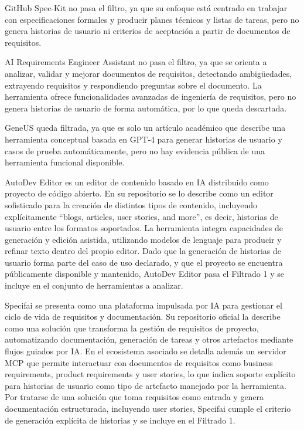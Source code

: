 GitHub Spec-Kit \cite{spec-kit} no pasa el filtro, ya que su enfoque está centrado en trabajar con especificaciones formales y producir planes técnicos y listas de tareas, pero no genera historias de usuario ni criterios de aceptación a partir de documentos de requisitos.

AI Requirements Engineer Assistant \cite{ai-requirements-engineer-assistant} no pasa el filtro, ya que se orienta a analizar, validar y mejorar documentos de requisitos, detectando ambigüedades, extrayendo requisitos y respondiendo preguntas sobre el documento. La herramienta ofrece funcionalidades avanzadas de ingeniería de requisitos, pero no genera historias de usuario de forma automática, por lo que queda descartada.

GeneUS \cite{geneuS}  queda filtrada, ya que es solo un artículo académico que describe una herramienta conceptual basada en GPT‑4 para generar historias de usuario y casos de prueba automáticamente, pero no hay evidencia pública de una herramienta funcional disponible.


AutoDev Editor \cite{autodeveditor} es un editor de contenido basado en IA distribuido como proyecto de código abierto. En su repositorio se lo describe como un editor sofisticado para la creación de distintos tipos de contenido, incluyendo explícitamente “blogs, articles, user stories, and more”, es decir, historias de usuario entre los formatos soportados. La herramienta integra capacidades de generación y edición asistida, utilizando modelos de lenguaje para producir y refinar texto dentro del propio editor. Dado que la generación de historias de usuario forma parte del caso de uso declarado, y que el proyecto se encuentra públicamente disponible y mantenido, AutoDev Editor pasa el Filtrado 1 y se incluye en el conjunto de herramientas a analizar.

Specifai \cite{specifai} se presenta como una plataforma impulsada por IA para gestionar el ciclo de vida de requisitos y documentación. Su repositorio oficial la describe como una solución que transforma la gestión de requisitos de proyecto, automatizando documentación, generación de tareas y otros artefactos mediante flujos guiados por IA. En el ecosistema asociado se detalla además un servidor MCP que permite interactuar con documentos de requisitos como business requirements, product requirements y user stories, lo que indica soporte explícito para historias de usuario como tipo de artefacto manejado por la herramienta. Por tratarse de una solución que toma requisitos como entrada y genera documentación estructurada, incluyendo user stories, Specifai cumple el criterio de generación explícita de historias y se incluye en el Filtrado 1.

